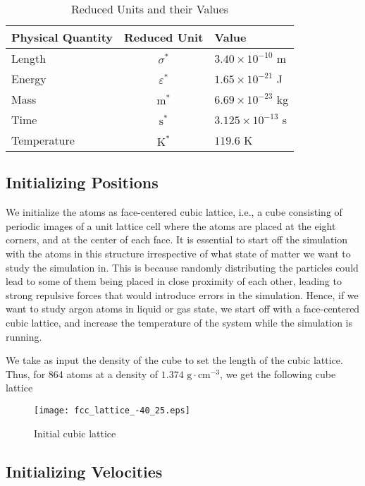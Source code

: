 \documentclass[../Main.tex]{subfiles}
\begin{document}
\begin{table}[H]
	\centering
	\begin{tabular}{ |l|c|l| }
		\hline
		Physical Quantity & Reduced Unit & Value \\
		\hline
		Length & $\sigma^{*}$ & $3.40 \times 10^{-10}$ m \\
		Energy & $\varepsilon^{*}$ & $1.65 \times 10^{-21}$ J \\
		Mass & $\mbox{m}^{*}$ & $ 6.69 \times 10^{-23}$ kg\\
		Time & $\mbox{s}^{*}$ & $3.125 \times 10^{-13}$ s \\
		Temperature & $\mbox{K}^{*}$ & $119.6$ K \\
		\hline
	\end{tabular}
	\caption{Reduced Units and their Values}
	\label{tbl:reduced_units}
\end{table}

\subsection{Initializing Positions}

We initialize the atoms as face-centered cubic lattice, i.e., a cube consisting of periodic images of a unit lattice cell where the atoms are placed at the eight corners, and at the center of each face. It is essential to start off the simulation with the atoms in this structure irrespective of what state of matter we want to study the simulation in. This is because randomly distributing the particles could lead to some of them being placed in close proximity of each other, leading to strong repulsive forces that would introduce errors in the simulation. Hence, if we want to study argon atoms in liquid or gas state, we start off with a face-centered cubic lattice, and increase the temperature of the system while the simulation is running.

We take as input the density of the cube to set the length of the cubic lattice. Thus, for 864 atoms at a density of $1.374 \mbox{ g}\cdot\mbox{cm}^{-3}$, we get the following cube lattice
 
\begin{figure}[H]
\centering
	\texttt{[image: fcc\_lattice\_-40\_25.eps]}
  	\caption{Initial cubic lattice}
	\label{fig:initial_cubic_lattice}
\end{figure}

\subsection{Initializing Velocities}
\end{document}
